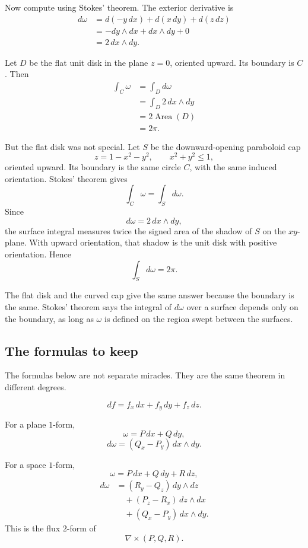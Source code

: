 Now compute using Stokes' theorem.  The exterior derivative is
\[
\begin{aligned}
    d\omega
    &=
    d(-y\,dx)+d(x\,dy)+d(z\,dz)\\
    &=
    -dy\wedge dx+dx\wedge dy+0\\
    &=
    2\,dx\wedge dy.
\end{aligned}
\]

Let \(D\) be the flat unit disk in the plane \(z=0\), oriented upward.  Its boundary is
\(C\).  Then
\[
\begin{aligned}
    \int_C\omega
    &=
    \int_D d\omega\\
    &=
    \int_D 2\,dx\wedge dy\\
    &=
    2\operatorname{Area}(D)\\
    &=
    2\pi.
\end{aligned}
\]

But the flat disk was not special.  Let \(S\) be the downward-opening paraboloid cap
\[
    z=1-x^2-y^2,
    \qquad
    x^2+y^2\le1,
\]
oriented upward.  Its boundary is the same circle \(C\), with the same induced
orientation.  Stokes' theorem gives
\[
    \int_C\omega=\int_S d\omega.
\]
Since
\[
    d\omega=2\,dx\wedge dy,
\]
the surface integral measures twice the signed area of the shadow of \(S\) on the
\(xy\)-plane.  With upward orientation, that shadow is the unit disk with positive
orientation.  Hence
\[
\boxed{
    \int_S d\omega=2\pi.
}
\]

The flat disk and the curved cap give the same answer because the boundary is the
same.  Stokes' theorem says the integral of \(d\omega\) over a surface depends only on
the boundary, as long as \(\omega\) is defined on the region swept between the surfaces.

\subsection{The formulas to keep}

The formulas below are not separate miracles.  They are the same theorem in different
degrees.

\[
\boxed{
    df=f_x\,dx+f_y\,dy+f_z\,dz.
}
\]

For a plane \(1\)-form,
\[
    \omega=P\,dx+Q\,dy,
\]
\[
\boxed{
    d\omega=(Q_x-P_y)\,dx\wedge dy.
}
\]

For a space \(1\)-form,
\[
    \omega=P\,dx+Q\,dy+R\,dz,
\]
\[
\boxed{
\begin{aligned}
    d\omega
    &=
    (R_y-Q_z)\,dy\wedge dz\\
    &\quad+
    (P_z-R_x)\,dz\wedge dx\\
    &\quad+
    (Q_x-P_y)\,dx\wedge dy.
\end{aligned}
}
\]
This is the flux \(2\)-form of
\[
    \nabla\times(P,Q,R).
\]

